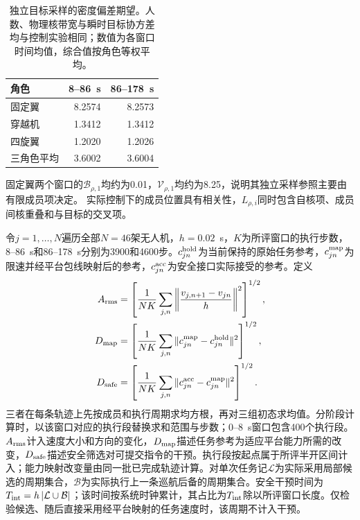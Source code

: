 \documentclass[UTF8,a4paper,11pt,fontset=none]{ctexart}
\begin{document}
\begin{table}[htbp]\centering\small
\caption{独立目标采样的密度偏差期望。人数、物理核带宽与瞬时目标协方差均与控制实验相同；数值为各窗口时间均值，综合值按角色等权平均。}\label{tab:target-sampling-reference}
\begin{tabular}{lrr}\toprule
角色 & 8--86~s & 86--178~s\\\midrule
固定翼 & 8.2574 & 8.2573\\
穿越机 & 1.3412 & 1.3412\\
四旋翼 & 1.2020 & 1.2026\\
三角色平均 & 3.6002 & 3.6004\\\bottomrule
\end{tabular}\end{table}

固定翼两个窗口的$\mathcal B_{\rho,1}$均约为0.01，$\mathcal V_{\rho,1}$均约为8.25，说明其独立采样参照主要由有限成员项决定。
实际控制下的成员位置具有相关性，$L_{\rho,i}$同时包含自核项、成员间核重叠和与目标的交叉项。

令$j=1,\ldots,N$遍历全部$N=46$架无人机，$h=0.02$~s，$K$为所评窗口的执行步数，8--86~s和86--178~s分别为3900和4600步。$c^{\rm hold}_{jn}$为当前保持的原始任务参考，$c^{\rm map}_{jn}$为限速并经平台包线映射后的参考，$c^{\rm acc}_{jn}$为安全接口实际接受的参考。定义
\begin{equation}
\begin{aligned}
A_{\rm rms}&=\left[\frac1{NK}\sum_{j,n}\left\|\frac{v_{j,n+1}-v_{jn}}h\right\|^2\right]^{1/2},\\
D_{\rm map}&=\left[\frac1{NK}\sum_{j,n}\|c^{\rm map}_{jn}-c^{\rm hold}_{jn}\|^2\right]^{1/2},\\
D_{\rm safe}&=\left[\frac1{NK}\sum_{j,n}\|c^{\rm acc}_{jn}-c^{\rm map}_{jn}\|^2\right]^{1/2}.
\end{aligned}\label{eq:effort-cost}
\end{equation}
三者在每条轨迹上先按成员和执行周期求均方根，再对三组初态求均值。分阶段计算时，以该窗口对应的执行段替换求和范围与步数；0--8~s窗口包含400个执行段。$A_{\rm rms}$计入速度大小和方向的变化，$D_{\rm map}$描述任务参考为适应平台能力所需的改变，$D_{\rm safe}$描述安全筛选对可提交指令的干预。执行段按起点属于所评半开区间计入；能力映射改变量由同一批已完成轨迹计算。对单次任务记$\mathcal L$为实际采用局部候选的周期集合，$\mathcal B$为实际执行上一条巡航后备的周期集合。安全干预时间为$T_{\rm int}=h\,|\mathcal L\cup\mathcal B|$；该时间按系统时钟累计，其占比为$T_{\rm int}$除以所评窗口长度。仅检验候选、随后直接采用经平台映射的任务速度时，该周期不计入干预。
\end{document}
